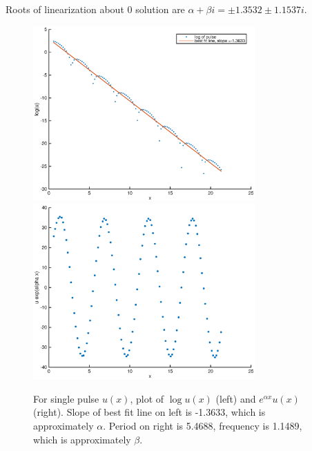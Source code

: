 \documentclass[12pt]{article}
\begin{document}
Roots of linearization about 0 solution are $\alpha + \beta i = \pm1.3532 \pm 1.1537i$.

\begin{figure}[H]
	\includegraphics[width=8.5cm]{decaysinglepulse.eps}
	\includegraphics[width=8.5cm]{oscsinglepulse.eps}
	\caption{For single pulse $u(x)$, plot of $\log u(x)$ (left) and $e^{\alpha x} u(x)$ (right). Slope of best fit line on left is -1.3633, which is approximately $\alpha$. Period on right is 5.4688, frequency is 1.1489, which is approximately $\beta$.}
\end{figure}
\end{document}
